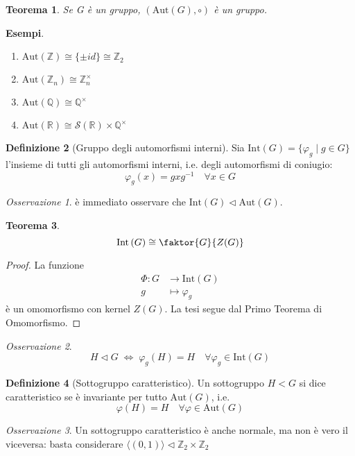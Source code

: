 \documentclass[a4paper]{article}
\newtheorem{theorem}{Teorema}[section]
\theoremstyle{remark}
\newtheorem*{remark}{Osservazione}
\theoremstyle{definition}
\newtheorem{definition}[theorem]{Definizione}
\newcommand{\Aut}[1]{\mathrm{Aut}\left( #1 \right)}
\newcommand{\Int}[1]{\mathrm{Int}\left( #1 \right)}
\newcommand{\fun}[5]{\begin{align*}
	#1 \colon #2 &\to #3 \\
	#4 &\mapsto #5
	\end{align*}}
\begin{document}
\begin{multicols}{2}
\begin{theorem}
	Se G è un gruppo, $ \left(\Aut{G}, \circ\right) $ è un gruppo.
\end{theorem}

\textbf{Esempi}.
\begin{enumerate}
	\item $ \Aut{\mathbb{Z}} \cong \{\pm id\} \cong \mathbb{Z}_2 $
	\item $ \Aut{\mathbb{Z}_n} \cong \mathbb{Z}_n^\times $
	\item $ \Aut{\mathbb{Q}} \cong \mathbb{Q}^\times $
	\item $ \Aut{\mathbb{R}} \cong \mathcal{S}(\mathbb{R}) \times \mathbb{Q}^\times $
\end{enumerate} 

\begin{definition}[Gruppo degli automorfismi interni]
	Sia $ \Int{G} = \{ \varphi_g \mid g \in G \} $ l'insieme di tutti gli automorfismi interni, i.e. degli automorfismi di coniugio: \[ \varphi_g(x) = gxg^{-1} \quad\forall x \in G \]
\end{definition}
\begin{remark}
	è immediato osservare che $ \Int{G} \lhd \Aut{G} $.
\end{remark}
\begin{theorem}
	\[ \Int{G} \cong \faktor{G}{Z(G)} \]
\end{theorem}
\begin{proof}
	La funzione \fun{\Phi}{G}{\Int{G}}{g}{\varphi_g} è un omomorfismo con kernel $ Z(G) $. La tesi segue dal Primo Teorema di Omomorfismo.
\end{proof}

\begin{remark}
	\[ H \lhd G \;\Leftrightarrow\; \varphi_g\left(H\right) = H \quad \forall \varphi_g \in \Int{G} \]
\end{remark}

\begin{definition}[Sottogruppo caratteristico]
	Un sottogruppo $ H < G $ si dice caratteristico se è invariante per tutto $ \Aut{G} $, i.e. $$ \varphi\left(H\right) = H \quad \forall \varphi \in \Aut{G} $$
\end{definition}
\begin{remark}
	Un sottogruppo caratteristico è anche normale, ma non è vero il viceversa: basta considerare $ \langle (0, 1) \rangle \lhd \mathbb{Z}_2 \times \mathbb{Z}_2 $
\end{remark}


\end{multicols}
\end{document}
